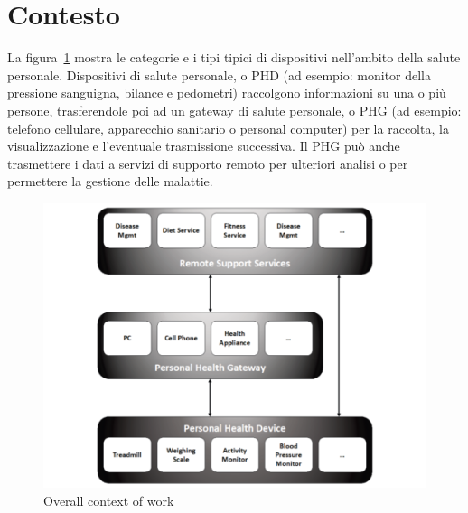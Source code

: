 \documentclass[a4paper]{article}
\begin{document}
    \section{Contesto}
        La figura~\ref{fig:overallContextOfWork} mostra le categorie e i tipi tipici di dispositivi nell'ambito della salute personale. Dispositivi di salute personale, o PHD 
        (ad esempio: monitor della pressione sanguigna, bilance e pedometri) raccolgono informazioni su una o più persone, trasferendole poi ad un gateway
        di salute personale, o PHG (ad esempio: telefono cellulare, apparecchio sanitario o personal computer) per la raccolta, la visualizzazione 
        e l'eventuale trasmissione successiva. Il PHG può anche trasmettere i dati a servizi di supporto remoto per ulteriori analisi o per permettere la gestione delle malattie.
    \begin{figure}[H]
        \centering
        \includegraphics[width=1\textwidth]{figures/overall context of work.png}
        \caption{Overall context of work}
        \label{fig:overallContextOfWork}
    \end{figure}
    
\end{document}
